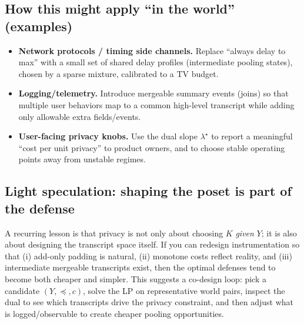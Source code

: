 \documentclass[11pt]{article}
\theoremstyle{definition}
\theoremstyle{remark}
\begin{document}
\subsection*{How this might apply ``in the world'' (examples)}
\begin{itemize}[leftmargin=*]
\item \textbf{Network protocols / timing side channels.} Replace ``always delay to max'' with a small set of shared delay profiles (intermediate pooling states), chosen by a sparse mixture, calibrated to a TV budget.
\item \textbf{Logging/telemetry.} Introduce mergeable summary events (joins) so that multiple user behaviors map to a common high-level transcript while adding only allowable extra fields/events.
\item \textbf{User-facing privacy knobs.} Use the dual slope $\lambda^\star$ to report a meaningful ``cost per unit privacy'' to product owners, and to choose stable operating points away from unstable regimes.
\end{itemize}

\subsection*{Light speculation: shaping the poset is part of the defense}
A recurring lesson is that privacy is not only about choosing $K$ \emph{given} $Y$; it is also about designing the transcript space itself.
If you can redesign instrumentation so that (i) add-only padding is natural, (ii) monotone costs reflect reality, and (iii) intermediate mergeable transcripts exist, then the optimal defenses tend to become both cheaper and simpler.
This suggests a co-design loop: pick a candidate $(Y,\preceq,c)$, solve the LP on representative world pairs, inspect the dual to see which transcripts drive the privacy constraint, and then adjust what is logged/observable to create cheaper pooling opportunities.
\end{document}
